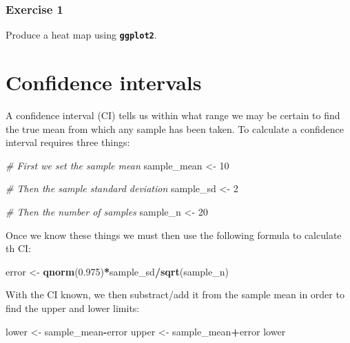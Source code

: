 \documentclass[english,10pt,a4paper,oneside]{book}
\newenvironment{Shaded}{\begin{snugshade}}{\end{snugshade}}
\newcommand{\CommentTok}[1]{\textcolor[rgb]{0.56,0.35,0.01}{\textit{#1}}}
\newcommand{\DecValTok}[1]{\textcolor[rgb]{0.00,0.00,0.81}{#1}}
\newcommand{\FloatTok}[1]{\textcolor[rgb]{0.00,0.00,0.81}{#1}}
\newcommand{\KeywordTok}[1]{\textcolor[rgb]{0.13,0.29,0.53}{\textbf{#1}}}
\newcommand{\NormalTok}[1]{#1}
\newcommand{\OperatorTok}[1]{\textcolor[rgb]{0.81,0.36,0.00}{\textbf{#1}}}
\newcommand{\StringTok}[1]{\textcolor[rgb]{0.31,0.60,0.02}{#1}}
\theoremstyle{definition}
\theoremstyle{definition}
\theoremstyle{definition}
\theoremstyle{remark}
\begin{document}
\hypertarget{exercise-1-5}{%
\subsection{Exercise 1}\label{exercise-1-5}}

Produce a heat map using \textbf{\texttt{ggplot2}}.

\hypertarget{confidence-intervals}{%
\chapter{Confidence intervals}\label{confidence-intervals}}

A confidence interval (CI) tells us within what range we may be certain
to find the true mean from which any sample has been taken. To calculate
a confidence interval requires three things:

\begin{Shaded}
\begin{Highlighting}[]
\CommentTok{# First we set the sample mean}
\NormalTok{sample_mean <-}\StringTok{ }\DecValTok{10}

\CommentTok{# Then the sample standard deviation}
\NormalTok{sample_sd <-}\StringTok{ }\DecValTok{2}

\CommentTok{# Then the number of samples}
\NormalTok{sample_n <-}\StringTok{ }\DecValTok{20}
\end{Highlighting}
\end{Shaded}

Once we know these things we must then use the following formula to
calculate th CI:

\begin{Shaded}
\begin{Highlighting}[]
\NormalTok{error <-}\StringTok{ }\KeywordTok{qnorm}\NormalTok{(}\FloatTok{0.975}\NormalTok{)}\OperatorTok{*}\NormalTok{sample_sd}\OperatorTok{/}\KeywordTok{sqrt}\NormalTok{(sample_n)}
\end{Highlighting}
\end{Shaded}

With the CI known, we then substract/add it from the sample mean in
order to find the upper and lower limits:

\begin{Shaded}
\begin{Highlighting}[]
\NormalTok{lower <-}\StringTok{ }\NormalTok{sample_mean}\OperatorTok{-}\NormalTok{error}
\NormalTok{upper <-}\StringTok{ }\NormalTok{sample_mean}\OperatorTok{+}\NormalTok{error}
\NormalTok{lower}
\end{Highlighting}
\end{Shaded}
\end{document}
